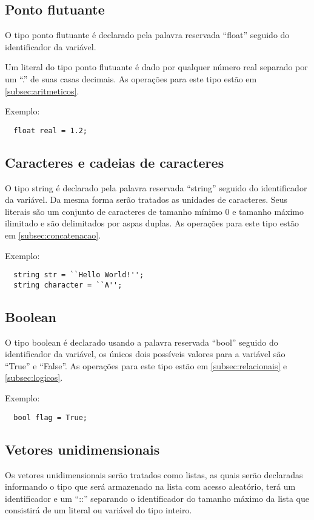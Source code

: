 \documentclass[a4paper, 12pt, article]{memoir}
\begin{document}
\subsection{Ponto flutuante}
\label{subsec:float}
O tipo ponto flutuante é declarado pela palavra reservada ``float'' seguido do identificador da variável.

Um literal do tipo ponto flutuante é dado por qualquer número real separado por um ``.'' de suas casas decimais. As operações para este tipo estão em \ref{subsec:aritmeticos}.

Exemplo:
\begin{lstlisting}
  float real = 1.2;
\end{lstlisting}

\subsection{Caracteres e cadeias de caracteres}
\label{subsec:string}
O tipo string é declarado pela palavra reservada ``string'' seguido do identificador da variável. Da mesma forma serão tratados as unidades de caracteres. Seus literais são um conjunto de caracteres de tamanho mínimo 0 e tamanho máximo ilimitado e são delimitados por aspas duplas. As operações para este tipo estão em
\ref{subsec:concatenacao}.

Exemplo:
\begin{lstlisting}
  string str = ``Hello World!'';
  string character = ``A'';
\end{lstlisting}

\subsection{Boolean}
\label{subsec:booleano}
O tipo boolean é declarado usando a palavra reservada ``bool'' seguido do identificador da
variável, os únicos dois possíveis valores para a variável são ``True''
e ``False''. As operações para este tipo estão em \ref{subsec:relacionais} e
\ref{subsec:logicos}.

Exemplo:
\begin{lstlisting}
  bool flag = True;
\end{lstlisting}

\subsection{Vetores unidimensionais}
\label{subsec:array}
Os vetores unidimensionais serão tratados como listas, as quais serão declaradas
informando o tipo que será armazenado na lista com acesso aleatório, terá um identificador e um
``::'' separando o identificador do tamanho máximo da lista que consistirá de um literal ou variável do tipo inteiro.
\end{document}
